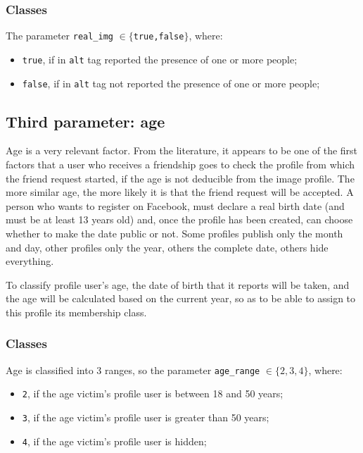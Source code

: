 \subsubsection*{Classes}
The parameter \texttt{real\_img} $ \in \{$\texttt{true,false}$\}$, where: 
\begin{itemize}
	\item \texttt{true}, if in \texttt{alt} tag reported the presence of one or more people;
	\item \texttt{false}, if in \texttt{alt} tag not reported the presence of one or more people;
\end{itemize}
\subsection{Third parameter: age} 
\label{cap:age-parameter}
Age is a very relevant factor. From the literature, it appears to be one of the first factors that a user who receives a friendship goes to check the profile from which the friend request started, if the age is not deducible from the image profile. 
The more similar age, the more likely it is that the friend request will be accepted. A person who wants to register on Facebook, must declare a real birth date (and must be at least 13 years old) and, once the profile has been created, can choose whether to make the date public or not. Some profiles publish only the month and day, other profiles only the year, others the complete date, others hide everything.\par \noindent To classify profile user's age, the date of birth that it reports will be taken, and the age will be calculated based on the current year, so as to be able to assign to this profile its membership class.
\subsubsection*{Classes}
Age is classified into 3 ranges, so the parameter \texttt{age\_range} $ \in \{2,3,4\}$, where: 
\begin{itemize}
	\item \texttt{2}, if the age victim's profile user is between 18 and 50 years;
	\item \texttt{3}, if the age victim's profile user is greater than 50 years;
	\item \texttt{4}, if the age victim's profile user is hidden;
\end{itemize}

